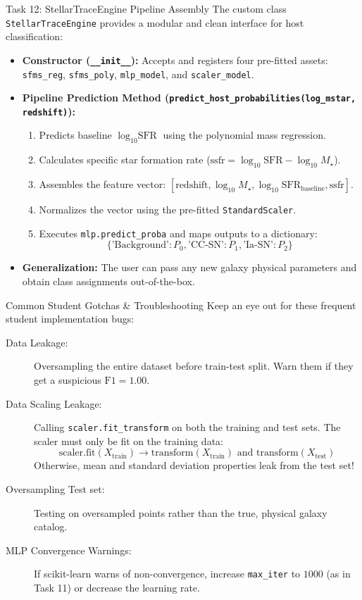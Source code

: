 \documentclass[9pt]{beamer}
\begin{document}
\begin{frame}{Task 12: StellarTraceEngine Pipeline Assembly}
  The custom class \texttt{StellarTraceEngine} provides a modular and clean interface for host classification:
  \begin{itemize}
    \item \textbf{Constructor (\texttt{\_\_init\_\_}):} Accepts and registers four pre-fitted assets: \texttt{sfms\_reg}, \texttt{sfms\_poly}, \texttt{mlp\_model}, and \texttt{scaler\_model}.
    \item \textbf{Pipeline Prediction Method (\texttt{predict\_host\_probabilities(log\_mstar, redshift)}):}
      \begin{enumerate}
        \item Predicts baseline $\log_{10} \text{SFR}$ using the polynomial mass regression.
        \item Calculates specific star formation rate ($\text{ssfr} = \log_{10} \text{SFR} - \log_{10} M_\star$).
        \item Assembles the feature vector: $[\text{redshift}, \log_{10} M_\star, \log_{10} \text{SFR}_{\text{baseline}}, \text{ssfr}]$.
        \item Normalizes the vector using the pre-fitted \texttt{StandardScaler}.
        \item Executes \texttt{mlp.predict\_proba} and maps outputs to a dictionary:
          $$\{\text{'Background'}: P_0, \text{'CC-SN'}: P_1, \text{'Ia-SN'}: P_2\}$$
      \end{enumerate}
    \item \textbf{Generalization:} The user can pass any new galaxy physical parameters and obtain class assignments out-of-the-box.
  \end{itemize}
\end{frame}

\begin{frame}{Common Student Gotchas \& Troubleshooting}
  Keep an eye out for these frequent student implementation bugs:
  \begin{description}
    \item[Data Leakage:]
      Oversampling the entire dataset before train-test split. Warn them if they get a suspicious $\text{F1} = 1.00$.
    \item[Data Scaling Leakage:]
      Calling \texttt{scaler.fit\_transform} on both the training and test sets. The scaler must only be fit on the training data:
      $$\text{scaler.fit}(X_{\text{train}}) \rightarrow \text{transform}(X_{\text{train}}) \text{ and } \text{transform}(X_{\text{test}})$$
      Otherwise, mean and standard deviation properties leak from the test set!
    \item[Oversampling Test set:]
      Testing on oversampled points rather than the true, physical galaxy catalog.
    \item[MLP Convergence Warnings:]
      If scikit-learn warns of non-convergence, increase \texttt{max\_iter} to $1000$ (as in Task 11) or decrease the learning rate.
  \end{description}
\end{frame}
\end{document}
